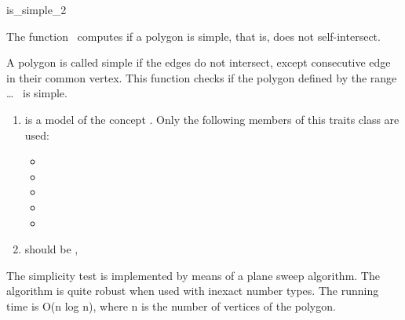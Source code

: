 

\begin{ccRefFunction}{is_simple_2} 


\ccDefinition
  
The function \ccRefName\ computes if a polygon is simple, that is, does not
self-intersect.


{
A polygon is called simple if the edges do not intersect, except consecutive
edge in their common vertex. This function checks if the polygon defined by the
range  \ldots\  is simple.
}


\begin{enumerate}
    \item {} is a model of the concept 
	  .
	  Only the following members of this traits class are used:
          \begin{itemize}
            \item {}
            \item {}
            \item {}
            \item {}
            \item {}
          \end{itemize}
    \item {} should be ,
\end{enumerate}

\ccImplementation

The simplicity test is implemented by means of a plane sweep algorithm.
The algorithm is quite robust when used with inexact number types.
The running time is O(n log n), where n is the number of vertices of the
polygon.

\ccSeeAlso

 \\
 \\


\end{ccRefFunction}


